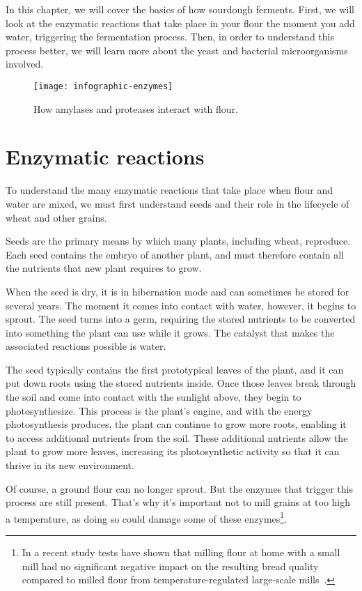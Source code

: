 In this chapter, we will cover the basics of how sourdough ferments.
First, we will look at the enzymatic reactions that take place
in your flour the moment you add water, triggering the fermentation
process. Then, in order to understand this process better, we will
learn more about the yeast and bacterial microorganisms involved.

\begin{figure}[!htb]
  \texttt{[image: infographic-enzymes]}
  \caption{How amylases and proteases interact with flour.}%
  \label{infographic-enzymes}
\end{figure}

\section{Enzymatic reactions}

To understand the many enzymatic reactions that take place when flour
and water are mixed, we must first understand seeds and their role in
the lifecycle of wheat and other grains.

Seeds are the primary means by which many plants, including wheat,
reproduce. Each seed contains the embryo of another plant, and must
therefore contain all the nutrients that new plant requires to grow.

When the seed is dry, it is in hibernation mode and can sometimes be
stored for several years. The moment it comes into contact with water,
however, it begins to sprout. The seed turns into a germ, requiring the
stored nutrients to be converted into something the plant can use while
it grows. The catalyst that makes the associated reactions possible is water.

The seed typically contains the first prototypical leaves of the plant,
and it can put down roots using the stored nutrients inside. Once those leaves
break through the soil and come into contact with the sunlight above, they
begin to photosynthesize. This process is the plant's engine, and with the
energy photosynthesis produces, the plant can continue to grow more roots,
enabling it to access additional nutrients from the soil. These additional
nutrients allow the plant to grow more leaves, increasing its photosynthetic
activity so that it can thrive in its new environment.

Of course, a ground flour can no longer sprout. But the enzymes that
trigger this process are still present. That's why it's important not to
mill grains at too high a temperature, as doing so could damage some of
these enzymes\footnote{In a recent study tests have shown that milling flour
at home with a small mill had no significant negative impact on the resulting
bread quality compared to milled flour from temperature-regulated large-scale
mills~\cite{milling+commercial+home+mill+comparison}.}.

